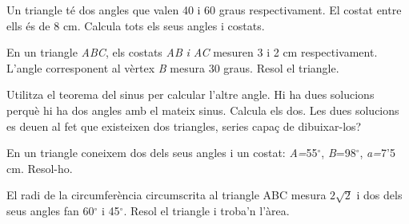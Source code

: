 \begin{mylist} 
	\exer
	Un triangle té dos angles que valen 40 i 60 graus respectivament. El
	costat entre ells és de 8 cm. Calcula tots els seus angles i costats.
	
	\exer
	En un triangle \emph{ABC}, els costats \emph{AB} \emph{i AC} mesuren 3
	i 2 cm respectivament. L'angle corresponent al vèrtex \emph{B} mesura
	30 graus. Resol el triangle.
	\begin{tasks}
		\task Utilitza el teorema del sinus per calcular l'altre angle. Hi ha dues
		solucions perquè hi ha dos angles amb el mateix sinus. Calcula els dos.
		\task Les dues solucions es deuen al fet que existeixen dos triangles, series
		capaç de dibuixar-los?
	\end{tasks}
	
	
	\exer
	En un triangle coneixem dos dels seus angles i un costat: \emph{A=}55${}^\circ$, \emph{B}=98${}^\circ$, \emph{a=}7'5 cm. Resol-ho.
		
	\exer El radi de la circumferència circumscrita al triangle ABC mesura $2\sqrt{2}$ i dos dels seus angles fan 60${}^\circ$ i 45${}^\circ$. Resol el triangle i troba'n l'àrea.
	


\end{mylist}
